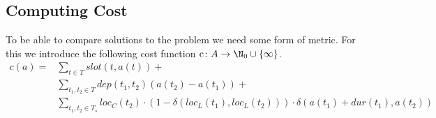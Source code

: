\subsection{Computing Cost}
\label{sec:semantics:semantics:computing-cost}
To be able to compare solutions to the problem we need some form of metric. For this we introduce the following cost function $\operatorname{c} \colon A \to \N_0 \cup \{ \infty \}$.
\begin{align*}
    c(a) = & \sum_{t \in T} slot(t, a(t)) +                                                                                        \\
           & \sum_{t_1, t_2 \in T} dep(t_1, t_2)(a(t_2) - a(t_1)) +                                                                \\
           & \sum_{t_1, t_2 \in T_s} loc_C(t_2) \cdot (1 - \delta(loc_L(t_1), loc_L(t_2))) \cdot \delta(a(t_1) + dur(t_1), a(t_2))
\end{align*}


